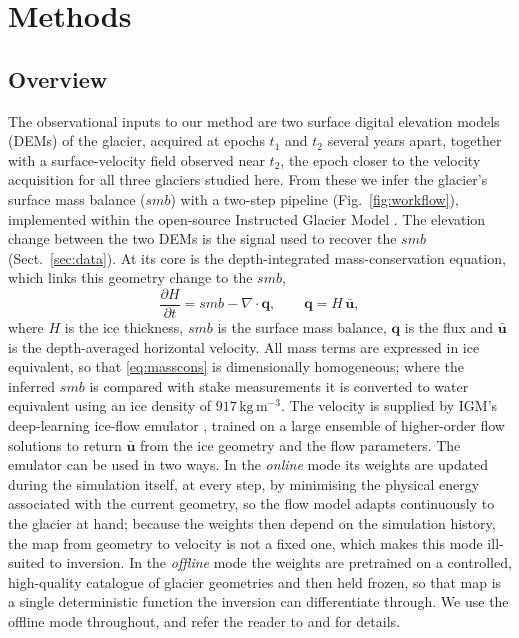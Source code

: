 \section{Methods}\label{sec:methods}

\subsection{Overview}\label{sec:overview}

The observational inputs to our method are two surface digital elevation models
(DEMs) of the glacier, acquired at epochs $t_1$ and $t_2$ several years apart,
together with a surface-velocity field observed near $t_2$, the epoch closer to the
velocity acquisition for all three glaciers studied here. From these we infer the
glacier's surface mass balance ($smb$) with a two-step pipeline
(Fig.~\ref{fig:workflow}), implemented within the open-source Instructed Glacier
Model \citep[IGM;][]{jouvet2026igm}.
The elevation change between
the two DEMs is the signal used to recover the $smb$ (Sect.~\ref{sec:data}).
At its core is the depth-integrated mass-conservation equation, which links this
geometry change to the $smb$,
\begin{equation}
  \frac{\partial H}{\partial t} = smb - \nabla\cdot\mathbf{q},
  \qquad
  \mathbf{q} = H\,\bar{\mathbf{u}},
  \label{eq:masscons}
\end{equation}
where $H$ is the ice thickness, $smb$ is the surface mass balance, $\mathbf{q}$ is the flux and
$\bar{\mathbf{u}}$ is the depth-averaged horizontal velocity. All mass terms are
expressed in ice equivalent, so that \eqref{eq:masscons} is dimensionally
homogeneous; where the inferred $smb$ is compared with stake measurements it is
converted to water equivalent using an ice density of $917\,\mathrm{kg\,m^{-3}}$.
The velocity is supplied by IGM's deep-learning ice-flow
emulator \citep{jouvet_cordonnier2023, rosier2026}, trained on a large ensemble of
higher-order flow solutions to return $\bar{\mathbf{u}}$ from the ice geometry and
the flow parameters.
The emulator can be used in two ways. In the \emph{online} mode its weights are
updated during the simulation itself, at every step, by minimising the physical
energy associated with the current geometry, so the flow model adapts continuously
to the glacier at hand; because the weights then depend on the simulation history,
the map from geometry to velocity is not a fixed one, which makes this mode
ill-suited to inversion. In the \emph{offline} mode the weights are pretrained on a
controlled, high-quality catalogue of glacier geometries and then held frozen, so
that map is a single deterministic function the inversion can differentiate
through. We use the offline mode throughout, and refer the reader to
\citet{jouvet2026igm} and \citet{rosier2026} for details.

